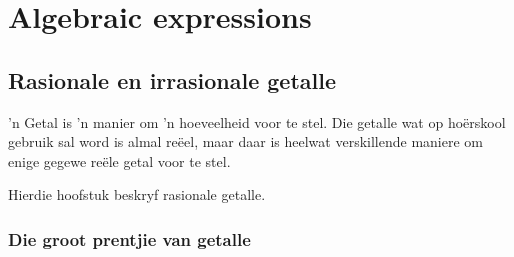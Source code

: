 \chapter{Algebraic expressions}
\section{Rasionale en irrasionale getalle}
\setcounter{figure}{1}
\setcounter{subfigure}{1}


’n Getal is ’n manier om ’n hoeveelheid voor te stel. Die getalle wat op hoërskool gebruik sal word is almal reëel, maar daar is heelwat verskillende maniere om enige gegewe reële
getal voor te stel.\par Hierdie hoofstuk beskryf rasionale getalle.\par 

    

\par 
\subsection*{Die groot prentjie van getalle}

